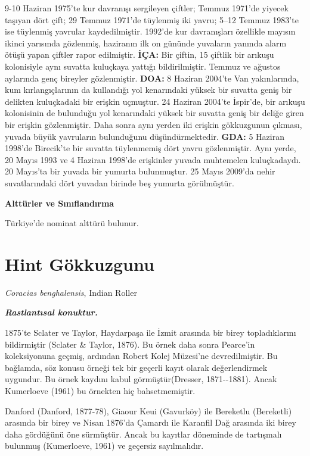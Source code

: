 \documentclass[
  10.5pt,
  a4paper,
  DIV=11,
  numbers=noendperiod,
  twocolumn]{scrreprt}
\begin{document}
9-10 Haziran 1975'te kur davranışı sergileyen çiftler; Temmuz 1971'de
yiyecek taşıyan dört çift; 29 Temmuz 1971'de tüylenmiş iki yavru; 5--12
Temmuz 1983'te ise tüylenmiş yavrular kaydedilmiştir. 1992'de kur
davranışları özellikle mayısın ikinci yarısında gözlenmiş, haziranın ilk
on gününde yuvaların yanında alarm ötüşü yapan çiftler rapor edilmiştir.
\textbf{İÇA:} Bir çiftin, 15 çiftlik bir arıkuşu kolonisiyle aynı
suvatta kuluçkaya yattığı bildirilmiştir. Temmuz ve ağustos aylarında
genç bireyler gözlenmiştir. \textbf{DOA:} 8 Haziran 2004'te Van
yakınlarında, kum kırlangıçlarının da kullandığı yol kenarındaki yüksek
bir suvatta geniş bir delikten kuluçkadaki bir erişkin uçmuştur. 24
Haziran 2004'te İspir'de, bir arıkuşu kolonisinin de bulunduğu yol
kenarındaki yüksek bir suvatta geniş bir deliğe giren bir erişkin
gözlenmiştir. Daha sonra aynı yerden iki erişkin gökkuzgunun çıkması,
yuvada büyük yavruların bulunduğunu düşündürmektedir. \textbf{GDA:} 5
Haziran 1998'de Birecik'te bir suvatta tüylenmemiş dört yavru
gözlenmiştir. Aynı yerde, 20 Mayıs 1993 ve 4 Haziran 1998'de erişkinler
yuvada muhtemelen kuluçkadaydı. 20 Mayıs'ta bir yuvada bir yumurta
bulunmuştur. 25 Mayıs 2009'da nehir suvatlarındaki dört yuvadan birinde
beş yumurta görülmüştür.

\textbf{Alttürler ve Sınıflandırma}

Türkiye'de nominat alttürü bulunur.

\section{Hint Gökkuzgunu}\label{hint-guxf6kkuzgunu}

\emph{Coracias benghalensis}, Indian Roller

\textbf{\emph{Rastlantısal konuktur.}}

1875'te Sclater ve Taylor, Haydarpaşa ile İzmit arasında bir birey
topladıklarını bildirmiştir (Sclater \& Taylor, 1876). Bu örnek daha
sonra Pearce'in koleksiyonuna geçmiş, ardından Robert Kolej Müzesi'ne
devredilmiştir. Bu bağlamda, söz konusu örneği tek bir geçerli kayıt
olarak değerlendirmek uygundur. Bu örnek kaydını kabul
görmüştür(Dresser, 1871-\/-1881). Ancak Kumerloeve (1961) bu örnekten
hiç bahsetmemiştir.

Danford (Danford, 1877-78), Giaour Keui (Gavurköy) ile Bereketlu
(Bereketli) arasında bir birey ve Nisan 1876'da Çamardı ile Karanfil Dağ
arasında iki birey daha gördüğünü öne sürmüştür. Ancak bu kayıtlar
döneminde de tartışmalı bulunmuş (Kumerloeve, 1961) ve geçersiz
sayılmalıdır.
\end{document}
